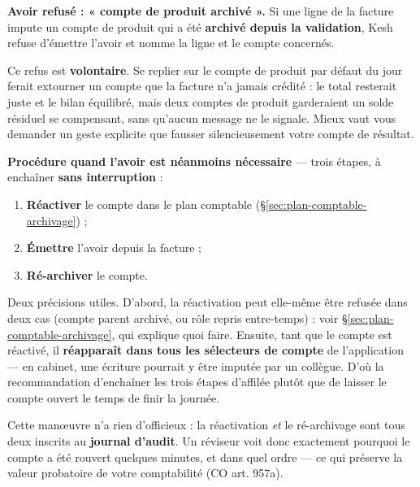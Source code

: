 \documentclass[a4paper,11pt,oneside]{article}
\begin{document}
\begin{keshwarning}
\textbf{Avoir refusé : « compte de produit archivé ».} Si une ligne de la facture impute un compte de produit qui a été \textbf{archivé depuis la validation}, Kesh refuse d'émettre l'avoir et nomme la ligne et le compte concernés.

Ce refus est \textbf{volontaire}. Se replier sur le compte de produit par défaut du jour ferait extourner un compte que la facture n'a jamais crédité : le total resterait juste et le bilan équilibré, mais deux comptes de produit garderaient un solde résiduel se compensant, sans qu'aucun message ne le signale. Mieux vaut vous demander un geste explicite que fausser silencieusement votre compte de résultat.

\medskip
\noindent\textbf{Procédure quand l'avoir est néanmoins nécessaire} — trois étapes, à enchaîner \textbf{sans interruption} :

\begin{enumerate}
    \item \textbf{Réactiver} le compte dans le plan comptable (\S\ref{sec:plan-comptable-archivage}) ;
    \item \textbf{Émettre} l'avoir depuis la facture ;
    \item \textbf{Ré-archiver} le compte.
\end{enumerate}

Deux précisions utiles. D'abord, la réactivation peut elle-même être refusée dans deux cas (compte parent archivé, ou rôle repris entre-temps) : voir \S\ref{sec:plan-comptable-archivage}, qui explique quoi faire. Ensuite, tant que le compte est réactivé, il \textbf{réapparaît dans tous les sélecteurs de compte} de l'application — en cabinet, une écriture pourrait y être imputée par un collègue. D'où la recommandation d'enchaîner les trois étapes d'affilée plutôt que de laisser le compte ouvert le temps de finir la journée.

\medskip
\noindent Cette manœuvre n'a rien d'officieux : la réactivation \emph{et} le ré-archivage sont tous deux inscrits au \textbf{journal d'audit}. Un réviseur voit donc exactement pourquoi le compte a été rouvert quelques minutes, et dans quel ordre — ce qui préserve la valeur probatoire de votre comptabilité (CO art. 957a).
\end{keshwarning}
\end{document}
